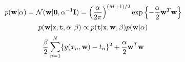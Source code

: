 $$p({\bf w}|\alpha)
={\cal N}({\bf w}|{\bf 0}, \alpha^{-1}{\bf I})
=\left( \frac{\alpha}{2\pi} \right)^{(M+1)/2} \exp \left\{ -\frac{\alpha}{2}{\bf w}^T {\bf w} \right\} $$
$$p({\bf w}| {\tt x}, {\tt t}, \alpha, \beta) \propto p({\tt t}| {\tt x}, {\bf w}, \beta)p({\bf w}|\alpha)$$
$$\frac{\beta}{2}\sum_{n=1}^{N}\{y(x_n , {\bf w})-t_n \}^2 + \frac{\alpha}{2}{\bf w}^T {\bf w}$$

